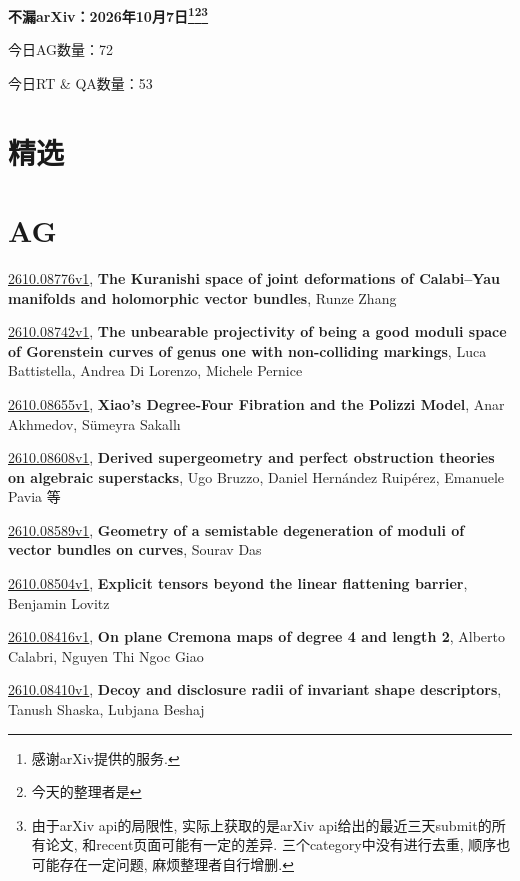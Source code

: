 \documentclass[9pt, a4paper]{article}
\theoremstyle{plain}
\theoremstyle{definition}
\theoremstyle{remark}
\newcommand{\arxiv}[3]{\href{https://arxiv.org/abs/#1}{#1}, \textbf{\textcolor{arxivblue}{#2}}, #3}
\newcommand{\AGnumber}{72}
\newcommand{\RTQAnumber}{53}
\newcommand{\NewestDate}{2026年10月7日}
\newcommand{\todayarXiver}{} %
\begin{document}
\begin{center}
    \Huge\textbf{不漏arXiv：\NewestDate\footnote{感谢arXiv提供的服务.}\footnote{今天的整理者是\todayarXiver}\footnote{由于arXiv api的局限性, 实际上获取的是arXiv api给出的最近三天submit的所有论文, 和recent页面可能有一定的差异. 三个category中没有进行去重, 顺序也可能存在一定问题, 麻烦整理者自行增删.}} \\
\end{center}

\setcounter{section}{-1}

\begin{center}
    今日AG数量：\AGnumber
    
    今日RT \& QA数量：\RTQAnumber
    
\end{center}


\section{精选}


\section{AG}
\arxiv{2610.08776v1}{The Kuranishi space of joint deformations of Calabi--Yau manifolds and holomorphic vector bundles}{Runze Zhang}

\arxiv{2610.08742v1}{The unbearable projectivity of being a good moduli space of Gorenstein curves of genus one with non-colliding markings}{Luca Battistella, Andrea Di Lorenzo, Michele Pernice}

\arxiv{2610.08655v1}{Xiao's Degree-Four Fibration and the Polizzi Model}{Anar Akhmedov, Sümeyra Sakallı}

\arxiv{2610.08608v1}{Derived supergeometry and perfect obstruction theories on algebraic superstacks}{Ugo Bruzzo, Daniel Hernández Ruipérez, Emanuele Pavia 等}

\arxiv{2610.08589v1}{Geometry of a semistable degeneration of moduli of vector bundles on curves}{Sourav Das}

\arxiv{2610.08504v1}{Explicit tensors beyond the linear flattening barrier}{Benjamin Lovitz}

\arxiv{2610.08416v1}{On plane Cremona maps of degree 4 and length 2}{Alberto Calabri, Nguyen Thi Ngoc Giao}

\arxiv{2610.08410v1}{Decoy and disclosure radii of invariant shape descriptors}{Tanush Shaska, Lubjana Beshaj}
\end{document}
